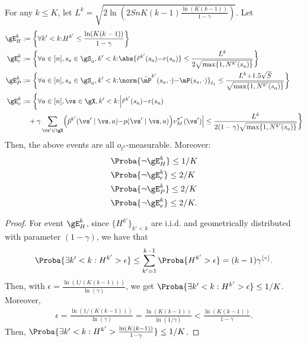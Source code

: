 \begin{subappendices}
\begin{lem}
    \label{lem:concentration}
    For any $k\le K$, let $L^{k}=\sqrt{2\ln\left(2SnK(k-1)\frac{\ln(K(k-1))}{1-\gamma}\right)}$. Let
    \begin{align}
        \gE^{k}_H&:= \bigg\{\forall k'< k{:} H^{k'}\le \frac{\ln(K(k-1))}{1-\gamma}\bigg\} \label{eq:conc_h}\\
        \gE^{k}_r&:= \bigg\{\forall a\in[n], s_a\in\gS_a, k'< k{:} \abs{\hat{r}^{k'}(s_a){-}r(s_a)} \le \frac{L^{k}}{2\sqrt{\max\{1,N^{k'}(s_a)\}}}\bigg\} \label{eq:conc_r} \\
        \gE^{k}_P&:= \bigg\{\forall a\in[n], s_a\in\gS_a, k'< k{:} \norm{\hat{\mP}^{k'}(s_a,\cdot){-}\mP(s_a, \cdot)}_{\ell_1} \le \frac{L^{k}{+}1.5\sqrt{S}}{\sqrt{\max\{1,N^{k'}(s_a)\}}}\bigg\} \label{eq:conc_q} \\
        \gE^{k}_v&:= \bigg\{\forall a\in[n], \vs\in\gX, k'< k{:} \Bigl\vert\hat{r}^{k'}(s_a){-}r(s_a) \nonumber \\
                   &\quad +\gamma \sum_{\vs'\in\gX}\Bigl(\hat{p}^{k'}(\vs' \mid\vs, a) {-}p(\vs'\mid\vs,a)\Bigr)v_M^{\pi^*}(\vs')\Bigr\vert
        \le \frac{L^{k}}{2(1-\gamma)\sqrt{\max\{1,N^{k'}(s_a)\}}}\bigg\} \label{eq:conc_V}
    \end{align}
    Then, the above events are all $o_{t^k}$-measurable. Moreover:
    \begin{align*}
        &\Proba{\lnot\gE^{k}_H}\le1/K \\ 
        &\Proba{\lnot \gE^{k}_r }\le 2/K \\
        &\Proba{\lnot \gE^{k}_P }\le 2/K \\
        &\Proba{\lnot \gE^{k}_v }\le 2/K.
    \end{align*} 
\end{lem}

\begin{proof}
    For event $\gE^{k}_H$, since $\{H^{k'}\}_{k'< k}$ are i.i.d. and geometrically distributed with parameter $(1-\gamma)$, we have that
    \begin{align*}
        \Proba{\exists k'< k: H^{k'}>\epsilon} \le \sum_{k'=1}^{k-1} \Proba{H^{k'}>\epsilon} =(k-1)\gamma^{\lfloor \epsilon\rfloor}.
    \end{align*}
    Then, with $\epsilon=\frac{\ln(1/(K(k-1)))}{\ln(\gamma)}$, we get $\Proba{\exists k'<k: H^{k'}>\epsilon}\le 1/K$.
    Moreover,
    \begin{align*}
        \epsilon = \frac{\ln(1/(K(k-1)))}{\ln(\gamma)}= \frac{\ln(K(k-1))}{\ln(1/\gamma)} < \frac{\ln(K(k-1))}{1-\gamma}.
    \end{align*}
    Then, $\Proba{\exists k'< k: H^{k'}>\frac{\ln(K(k-1))}{1-\gamma}}\le 1/K$.


\end{proof}
\end{subappendices}
